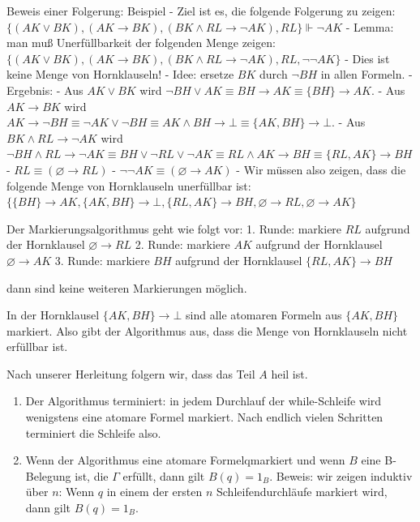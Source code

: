 \documentclass[a4paper]{article}
\begin{document}
\begin{multicols}{3}
  Beweis einer Folgerung: Beispiel - Ziel ist es, die folgende Folgerung
  zu zeigen:
  $\{(AK\vee BK),(AK\rightarrow BK),(BK\wedge RL\rightarrow\lnot AK),RL\}\Vdash\lnot AK$
  - Lemma: man muß Unerfüllbarkeit der folgenden Menge zeigen:
  $\{(AK\vee BK),(AK\rightarrow BK),(BK\wedge RL\rightarrow \lnot AK),RL,\lnot\lnot AK\}$
  - Dies ist keine Menge von Hornklauseln! - Idee: ersetze $BK$ durch
  $\lnot BH$ in allen Formeln. - Ergebnis: - Aus $AK\vee BK$ wird
  $\lnot BH\vee AK\equiv BH\rightarrow AK\equiv\{BH\}\rightarrow AK$. -
  Aus $AK\rightarrow BK$ wird
  $AK\rightarrow\lnot BH\equiv\lnot AK\vee\lnot BH\equiv AK\wedge BH\rightarrow\bot\equiv\{AK,BH\} \rightarrow\bot$.
  - Aus $BK\wedge RL\rightarrow\lnot AK$ wird
  $\lnot BH\wedge RL\rightarrow\lnot AK\equiv BH\vee\lnot RL\vee\lnot AK\equiv RL\wedge AK\rightarrow BH\equiv\{RL,AK\}\rightarrow BH$
  - $RL\equiv (\varnothing\rightarrow RL)$ -
  $\lnot\lnot AK\equiv (\varnothing\rightarrow AK)$ - Wir müssen also
  zeigen, dass die folgende Menge von Hornklauseln unerfüllbar ist:
  $\{\{BH\}\rightarrow AK,\{AK,BH\}\rightarrow\bot,\{RL,AK\}\rightarrow BH,\varnothing\rightarrow RL,\varnothing\rightarrow AK\}$

  Der Markierungsalgorithmus geht wie folgt vor: 1. Runde: markiere $RL$
  aufgrund der Hornklausel $\varnothing\rightarrow RL$ 2. Runde: markiere
  $AK$ aufgrund der Hornklausel $\varnothing\rightarrow AK$ 3. Runde:
  markiere $BH$ aufgrund der Hornklausel $\{RL,AK\}\rightarrow BH$

  dann sind keine weiteren Markierungen möglich.

  In der Hornklausel $\{AK,BH\}\rightarrow\bot$ sind alle atomaren Formeln
  aus $\{AK,BH\}$ markiert. Also gibt der Algorithmus aus, dass die Menge
  von Hornklauseln nicht erfüllbar ist.

  Nach unserer Herleitung folgern wir, dass das Teil $A$ heil ist.

  \begin{enumerate}
    \itemsep1pt\parskip0pt
    \item
          Der Algorithmus terminiert: in jedem Durchlauf der while-Schleife wird
          wenigstens eine atomare Formel markiert. Nach endlich vielen Schritten
          terminiert die Schleife also.
    \item
          Wenn der Algorithmus eine atomare Formelqmarkiert und wenn $B$ eine
          B-Belegung ist, die $\Gamma$ erfüllt, dann gilt $B(q) = 1_B$. Beweis:
          wir zeigen induktiv über $n$: Wenn $q$ in einem der ersten $n$
          Schleifendurchläufe markiert wird, dann gilt $B(q) = 1_B$.
  \end{enumerate}


\end{multicols}
\end{document}
